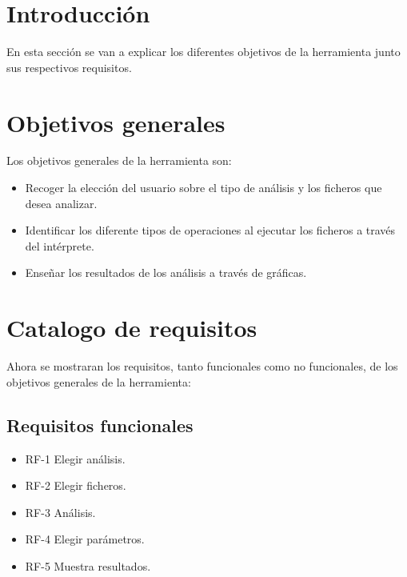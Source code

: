 
\section{Introducción}
En esta sección se van a explicar los diferentes objetivos de la herramienta junto sus respectivos requisitos.

\section{Objetivos generales}
Los objetivos generales de la herramienta son:

\begin{itemize}
	\item Recoger la elección del usuario sobre el tipo de análisis y los ficheros que desea analizar.
	\item Identificar los diferente tipos de operaciones al ejecutar los ficheros a través del intérprete. 
	\item Enseñar los resultados de los análisis a través de gráficas.
\end{itemize}

\section{Catalogo de requisitos}
Ahora se mostraran los requisitos, tanto funcionales como no funcionales, de los objetivos generales de la herramienta:

\subsection{Requisitos funcionales}
\begin{itemize}
	\item RF-1 Elegir análisis.
	\item RF-2 Elegir ficheros. 
	\item RF-3 Análisis.
	\item RF-4 Elegir parámetros.
	\item RF-5 Muestra resultados.
	
\end{itemize}
